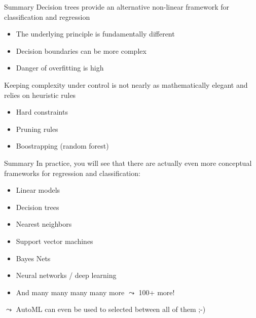\documentclass[aspectratio=169]{../latex_main/tntbeamer}  %
\begin{document}
	\begin{frame}{Summary}
	    Decision trees provide an alternative non-linear framework for classification and regression
	    \begin{itemize}
	        \item The underlying principle is fundamentally different
	        \item Decision boundaries can be more complex
	        \item Danger of overfitting is high
	    \end{itemize}
	    \bigskip
	    Keeping complexity under control is not nearly as mathematically elegant and relies on heuristic rules
	    \begin{itemize}
	        \item Hard constraints
	        \item Pruning rules
	        \item Boostrapping (random forest)
	    \end{itemize}
	\end{frame}
	
	\begin{frame}{Summary}
	   In practice, you will see that there are actually even more conceptual frameworks for regression and classification:
	    \begin{itemize}
	        \item Linear models
	        \item Decision trees
	        \item Nearest neighbors
	        \item Support vector machines
	        \item Bayes Nets
            \item Neural networks / deep learning
	        \item And many many many many more $\leadsto$ 100+ more!
	    \end{itemize}
	    
	    \bigskip
	    
	    $\leadsto$ AutoML can even be used to selected between all of them ;-)
	\end{frame}
\end{document}
